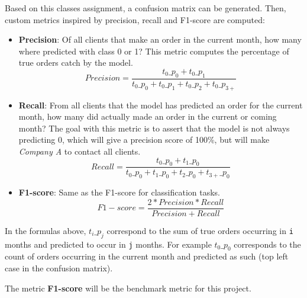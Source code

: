 \begin{center}
\end{center}

Based on this classes assignment, a confusion matrix can be generated. Then, custom metrics inspired by precision, recall and F1-score are computed:
\begin{itemize}
    \item \textbf{Precision}: Of all clients that make an order in the current month, how many where predicted with class 0 or 1? This metric computes the percentage of true orders catch by the model. $$ Precision = \frac{t_0\_p_0 + t_0\_p_1}{t_0\_p_0 + t_0\_p_1 + t_0\_p_2 + t_0\_p_{3+}} $$
    
    \item \textbf{Recall}: From all clients that the model has predicted an order for the current month, how many did actually made an order in the current or coming month? The goal with this metric is to assert that the model is not always predicting 0, which will give a precision score of 100\%, but will make \textit{Company A} to contact all clients. $$ Recall = \frac{t_0\_p_0 + t_1\_p_0}{t_0\_p_0 + t_1\_p_0 + t_2\_p_0 + t_{3+}\_p_0} $$
    
    \item \textbf{F1-score}: Same as the F1-score for classification tasks. $$ F1-score = \frac{2*Precision*Recall}{Precision+Recall} $$
\end{itemize}

In the formulas above, $t_i\_p_j$ correspond to the sum of true orders occurring in \texttt{i} months and predicted to occur in \texttt{j} months. For example $t_0\_p_0$ corresponds to the count of orders occurring in the current month and predicted as such (top left case in the confusion matrix).

The metric \textbf{F1-score} will be the benchmark metric for this project.


